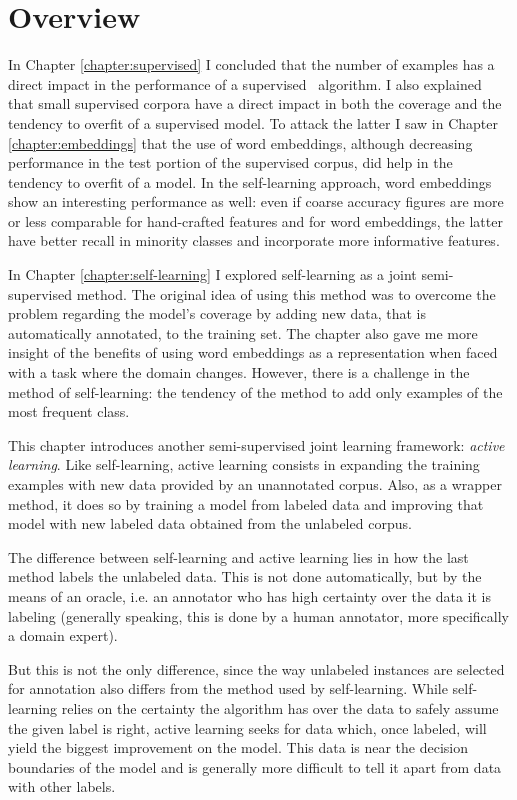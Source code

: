 \section{Overview}

In Chapter \ref{chapter:supervised} I concluded that the number of examples has
a direct impact in the performance of a supervised \vsd~algorithm. I also
explained that small supervised corpora have a direct impact in both the
coverage and the tendency to overfit of a supervised model. To attack the
latter I saw in Chapter \ref{chapter:embeddings} that the use of word
embeddings, although decreasing performance in the test portion of the
supervised corpus, did help in the tendency to overfit of a model. In the
self-learning approach, word embeddings show an interesting performance as
well: even if coarse accuracy figures are more or less comparable for
hand-crafted features and for word embeddings, the latter have better recall in
minority classes and incorporate more informative features.

In Chapter \ref{chapter:self-learning} I explored self-learning as a joint
semi-supervised method. The original idea of using this method was to overcome
the problem regarding the model's coverage by adding new data, that is
automatically annotated, to the training set. The chapter also gave me more
insight of the benefits of using word embeddings as a representation when faced
with a task where the domain changes. However, there is a challenge in the
method of self-learning: the tendency of the method to add only examples of the
most frequent class.

This chapter introduces another semi-supervised joint learning framework: {\em
active learning}. Like self-learning, active learning consists in expanding the
training examples with new data provided by an unannotated corpus. Also, as a
wrapper method, it does so by training a model from labeled data and improving
that model with new labeled data obtained from the unlabeled corpus. 

The difference between self-learning and active learning lies in how the last
method labels the unlabeled data. This is not done automatically, but by the
means of an oracle, i.e. an annotator who has high certainty over the data it
is labeling (generally speaking, this is done by a human annotator, more
specifically a domain expert).

But this is not the only difference, since the way unlabeled instances are
selected for annotation also differs from the method used by self-learning.
While self-learning relies on the certainty the algorithm has over the data to
safely assume the given label is right, active learning seeks for data which,
once labeled, will yield the biggest improvement on the model. This data is
near the decision boundaries of the model and is generally more difficult to
tell it apart from data with other labels. 

